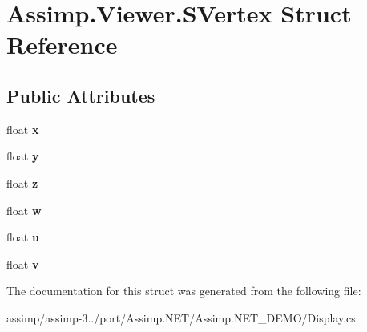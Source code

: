 \hypertarget{struct_assimp_1_1_viewer_1_1_s_vertex}{\section{Assimp.\+Viewer.\+S\+Vertex Struct Reference}
\label{struct_assimp_1_1_viewer_1_1_s_vertex}
}
\subsection*{Public Attributes}
\begin{DoxyCompactItemize}
\item 
\hypertarget{struct_assimp_1_1_viewer_1_1_s_vertex_a9a7148803c10288ce0a3b99d2574ce98}{float {\bfseries x}}\label{struct_assimp_1_1_viewer_1_1_s_vertex_a9a7148803c10288ce0a3b99d2574ce98}

\item 
\hypertarget{struct_assimp_1_1_viewer_1_1_s_vertex_a96a4b3334e51131cb353cdaf736e75b8}{float {\bfseries y}}\label{struct_assimp_1_1_viewer_1_1_s_vertex_a96a4b3334e51131cb353cdaf736e75b8}

\item 
\hypertarget{struct_assimp_1_1_viewer_1_1_s_vertex_a107083be3a2e4f2edf31fe024abd5d90}{float {\bfseries z}}\label{struct_assimp_1_1_viewer_1_1_s_vertex_a107083be3a2e4f2edf31fe024abd5d90}

\item 
\hypertarget{struct_assimp_1_1_viewer_1_1_s_vertex_a7b705dd9416d184fdd746e5c22e7921f}{float {\bfseries w}}\label{struct_assimp_1_1_viewer_1_1_s_vertex_a7b705dd9416d184fdd746e5c22e7921f}

\item 
\hypertarget{struct_assimp_1_1_viewer_1_1_s_vertex_a7428c77d11a1f4a3b445a4697bea5c43}{float {\bfseries u}}\label{struct_assimp_1_1_viewer_1_1_s_vertex_a7428c77d11a1f4a3b445a4697bea5c43}

\item 
\hypertarget{struct_assimp_1_1_viewer_1_1_s_vertex_ae6018b75ac5ada390f3f76a3c16fd690}{float {\bfseries v}}\label{struct_assimp_1_1_viewer_1_1_s_vertex_ae6018b75ac5ada390f3f76a3c16fd690}

\end{DoxyCompactItemize}


The documentation for this struct was generated from the following file\+:\begin{DoxyCompactItemize}
\item 
assimp/assimp-\/3../port/\+Assimp.\+N\+E\+T/\+Assimp.\+N\+E\+T\+\_\+\+D\+E\+M\+O/Display.\+cs\end{DoxyCompactItemize}
